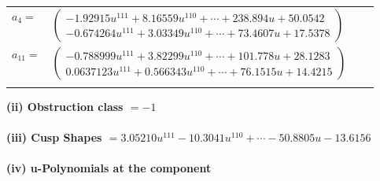 \documentclass[1p]{elsarticle_modified}
\theoremstyle{definition}
\begin{document}
\begin{tabular}{m{7pt} m{180pt} m{7pt} m{180pt} }
\flushright $a_{4}=$&$\begin{pmatrix}-1.92915 u^{111}+8.16559 u^{110}+\cdots+238.894 u+50.0542\\-0.674264 u^{111}+3.03349 u^{110}+\cdots+73.4607 u+17.5378\end{pmatrix}$ \\
\flushright $a_{11}=$&$\begin{pmatrix}-0.788999 u^{111}+3.82299 u^{110}+\cdots+101.778 u+28.1283\\0.0637123 u^{111}+0.566343 u^{110}+\cdots+76.1515 u+14.4215\end{pmatrix}$\\&\end{tabular}
\flushleft \textbf{(ii) Obstruction class $= -1$}\\~\\
\flushleft \textbf{(iii) Cusp Shapes $= 3.05210 u^{111}-10.3041 u^{110}+\cdots-50.8805 u-13.6156$}\\~\\
\newpage\renewcommand{\arraystretch}{1}
\flushleft \textbf{(iv) u-Polynomials at the component}\newline \\
\end{document}
